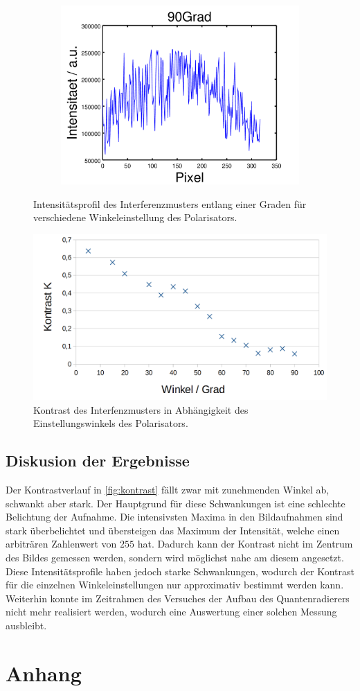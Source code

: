 \documentclass[numbers=noenddot,a4paper,notitlepage,twoside,BCOR15mm]{scrartcl}
\begin{document}
\begin{figure}
\begin{subfigure}{.49\textwidth}
	\end{subfigure}
	\begin{subfigure}{.49\textwidth}
		\centering
		\includegraphics[width=0.75\linewidth]{pics/90grad.png}
	\end{subfigure}
	\caption{Intensitätsprofil des Interferenzmusters entlang einer Graden für verschiedene Winkeleinstellung des Polarisators.}
	\label{fig:test}
\end{figure}

\begin{figure}
	\centering
	\includegraphics[width=0.8\columnwidth]{pics/Kontrast.png}
	\caption{Kontrast des Interfenzmusters in Abhängigkeit des Einstellungswinkels des Polarisators.}
	\label{fig:kontrast}
\end{figure}
\newpage
\subsection{Diskusion der Ergebnisse}

Der Kontrastverlauf in \autoref{fig:kontrast} fällt zwar mit zunehmenden Winkel ab, schwankt aber stark. Der Hauptgrund für diese Schwankungen ist eine schlechte Belichtung der Aufnahme. Die intensivsten Maxima in den Bildaufnahmen sind stark überbelichtet und übersteigen das Maximum der Intensität, welche einen arbiträren Zahlenwert von $255$ hat. Dadurch kann der Kontrast nicht im Zentrum des Bildes gemessen werden, sondern wird möglichst nahe am diesem angesetzt. Diese Intensitätsprofile haben jedoch starke Schwankungen, wodurch der Kontrast für die einzelnen Winkeleinstellungen nur approximativ bestimmt werden kann.\\
Weiterhin konnte im Zeitrahmen des Versuches der Aufbau des Quantenradierers nicht mehr realisiert werden, wodurch eine Auswertung einer solchen Messung ausbleibt.
	
	\newpage
	\section{Anhang}

		
		
\end{document}
